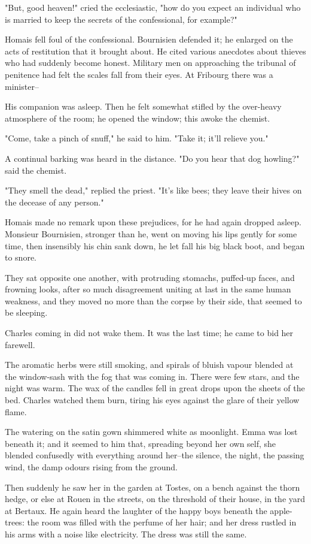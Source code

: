 \documentclass{tufte-book}
\begin{document}
"But, good heaven!" cried the ecclesiastic, "how do you expect an
individual who is married to keep the secrets of the confessional, for
example?"

Homais fell foul of the confessional. Bournisien defended it; he
enlarged on the acts of restitution that it brought about. He cited
various anecdotes about thieves who had suddenly become honest. Military
men on approaching the tribunal of penitence had felt the scales fall
from their eyes. At Fribourg there was a minister--

His companion was asleep. Then he felt somewhat stifled by the
over-heavy atmosphere of the room; he opened the window; this awoke the
chemist.

"Come, take a pinch of snuff," he said to him. "Take it; it'll relieve
you."

A continual barking was heard in the distance. "Do you hear that dog
howling?" said the chemist.

"They smell the dead," replied the priest. "It's like bees; they leave
their hives on the decease of any person."

Homais made no remark upon these prejudices, for he had again dropped
asleep. Monsieur Bournisien, stronger than he, went on moving his lips
gently for some time, then insensibly his chin sank down, he let fall
his big black boot, and began to snore.

They sat opposite one another, with protruding stomachs, puffed-up
faces, and frowning looks, after so much disagreement uniting at last in
the same human weakness, and they moved no more than the corpse by their
side, that seemed to be sleeping.

Charles coming in did not wake them. It was the last time; he came to
bid her farewell.

The aromatic herbs were still smoking, and spirals of bluish vapour
blended at the window-sash with the fog that was coming in. There were
few stars, and the night was warm. The wax of the candles fell in great
drops upon the sheets of the bed. Charles watched them burn, tiring his
eyes against the glare of their yellow flame.

The watering on the satin gown shimmered white as moonlight. Emma was
lost beneath it; and it seemed to him that, spreading beyond her own
self, she blended confusedly with everything around her--the silence,
the night, the passing wind, the damp odours rising from the ground.

Then suddenly he saw her in the garden at Tostes, on a bench against the
thorn hedge, or else at Rouen in the streets, on the threshold of their
house, in the yard at Bertaux. He again heard the laughter of the happy
boys beneath the apple-trees: the room was filled with the perfume
of her hair; and her dress rustled in his arms with a noise like
electricity. The dress was still the same.
\end{document}
